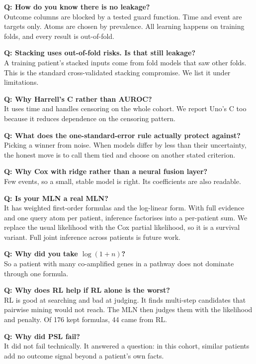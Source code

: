 \documentclass[11pt,a4paper]{article}
\begin{document}
\textbf{Q: How do you know there is no leakage?}\\
Outcome columns are blocked by a tested guard function. Time and event are targets only. Atoms are chosen by prevalence. All learning happens on training folds, and every result is out-of-fold.

\textbf{Q: Stacking uses out-of-fold risks. Is that still leakage?}\\
A training patient's stacked inputs come from fold models that saw other folds. This is the standard cross-validated stacking compromise. We list it under limitations.

\textbf{Q: Why Harrell's C rather than AUROC?}\\
It uses time and handles censoring on the whole cohort. We report Uno's C too because it reduces dependence on the censoring pattern.

\textbf{Q: What does the one-standard-error rule actually protect against?}\\
Picking a winner from noise. When models differ by less than their uncertainty, the honest move is to call them tied and choose on another stated criterion.

\textbf{Q: Why Cox with ridge rather than a neural fusion layer?}\\
Few events, so a small, stable model is right. Its coefficients are also readable.

\textbf{Q: Is your MLN a real MLN?}\\
It has weighted first-order formulas and the log-linear form. With full evidence and one query atom per patient, inference factorises into a per-patient sum. We replace the usual likelihood with the Cox partial likelihood, so it is a survival variant. Full joint inference across patients is future work.

\textbf{Q: Why did you take $\log(1+n)$?}\\
So a patient with many co-amplified genes in a pathway does not dominate through one formula.

\textbf{Q: Why does RL help if RL alone is the worst?}\\
RL is good at searching and bad at judging. It finds multi-step candidates that pairwise mining would not reach. The MLN then judges them with the likelihood and penalty. Of 176 kept formulas, 44 came from RL.

\textbf{Q: Why did PSL fail?}\\
It did not fail technically. It answered a question: in this cohort, similar patients add no outcome signal beyond a patient's own facts.
\end{document}
